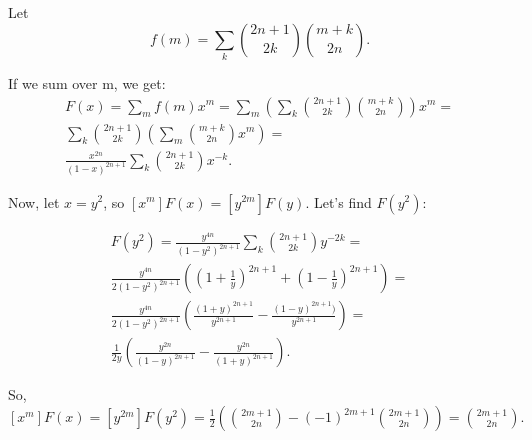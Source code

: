 \documentclass{article}
\begin{document}
Let 
\begin{equation}
	f(m) = \sum_{k} \binom{2n + 1}{2k}\binom{m + k}{2n}.
\end{equation}

If we sum over m, we get:
\begin{eqnarray}
F(x) = \sum_{m}f(m) x^{m} = \sum_{m}\left(\sum_{k} \binom{2n + 1}{2k}\binom{m + k}{2n}\right) x^{m} = \nonumber\\
\sum_{k} \binom{2n + 1}{2k} \left(\sum_{m}\binom{m + k}{2n} x^{m}\right) = \nonumber\\
\frac{x^{2n}}{(1 - x)^{2n + 1}} \sum_{k}\binom{2n + 1}{2k}x^{-k}.
\end{eqnarray}

Now, let $x = y^{2}$, so $[x^{m}]F(x) = [y^{2m}]F(y)$. Let's find $F(y^2)$:

\begin{eqnarray}
F(y^2) = \frac{y^{4n}}{(1 - y^2)^{2n + 1}} \sum_{k} \binom{2n + 1}{2k}y^{-2k} = \nonumber\\
\frac{y^{4n}}{2(1 - y^2)^{2n + 1}}\left( \left(1 + \frac{1}{y}\right)^{2n + 1} + \left(1 - \frac{1}{y}\right)^{2n + 1} \right) = \nonumber\\
\frac{y^{4n}}{2(1 - y^2)^{2n + 1}}\left(\frac{(1 + y)^{2n + 1}}{y^{2n + 1}} - \frac{(1 - y)^{2n + 1})}{y^{2n + 1}} \right) = \nonumber\\
\frac{1}{2y}\left(\frac{y^{2n}}{(1 - y)^{2n + 1}} - \frac{y^{2n}}{(1 + y)^{2n + 1}}\right).
\end{eqnarray}

So, $[x^{m}]F(x) = [y^{2m}]F(y^2) = \frac{1}{2}\left( \binom{2m + 1}{2n} - (-1)^{2m + 1}\binom{2m + 1}{2n} \right) = \binom{2m + 1}{2n}.$
\end{document}

